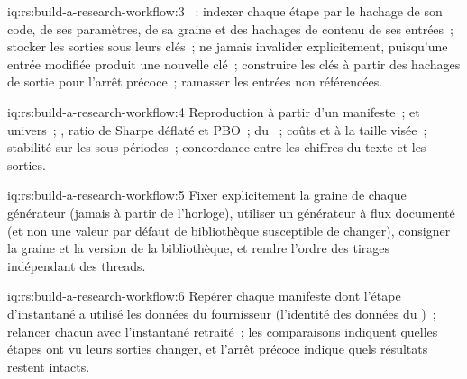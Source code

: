 \begin{solution}{iq:rs:build-a-research-workflow:3}
~: indexer chaque étape par le hachage de son code, de ses paramètres, de sa graine et des hachages de contenu de ses entrées~; stocker les sorties sous leurs clés~; ne jamais invalider
explicitement, puisqu'une entrée modifiée produit une nouvelle clé~; construire les clés à partir des hachages de sortie pour l'arrêt précoce~; ramasser les entrées non référencées.
\end{solution}

\begin{solution}{iq:rs:build-a-research-workflow:4}
Reproduction à partir d'un manifeste~;  et univers~; , ratio de Sharpe déflaté et PBO~;  du ~; coûts et
 à la taille visée~; stabilité sur les sous-périodes~; concordance entre les chiffres du texte et les sorties.
\end{solution}

\begin{solution}{iq:rs:build-a-research-workflow:5}
Fixer explicitement la graine de chaque générateur (jamais à partir de l'horloge), utiliser un générateur à flux documenté (et non une valeur par défaut de bibliothèque susceptible de changer), consigner la graine et la
version de la bibliothèque, et rendre l'ordre des tirages indépendant des threads.
\end{solution}

\begin{solution}{iq:rs:build-a-research-workflow:6}
Repérer chaque manifeste dont l'étape d'instantané a utilisé les données du fournisseur (l'identité des données du )~; relancer chacun avec l'instantané retraité~; les comparaisons indiquent quelles étapes
ont vu leurs sorties changer, et l'arrêt précoce indique quels résultats restent intacts.
\end{solution}
